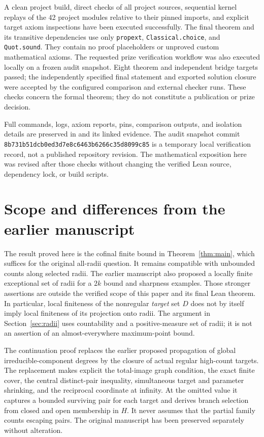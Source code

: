 \documentclass[11pt]{article}
\numberwithin{equation}{section}
\begin{document}
A clean project build, direct checks of all project sources, sequential
kernel replays of the 42 project modules relative to their pinned imports,
and explicit target axiom inspections have been executed successfully.
The final theorem and its transitive dependencies use only
\texttt{propext}, \texttt{Classical.choice}, and \texttt{Quot.sound}.
They contain no proof placeholders or unproved custom mathematical axioms.
The requested prize verification workflow was also executed locally on a
frozen audit snapshot. Eight theorem and independent bridge targets passed;
the independently specified final statement and exported solution closure
were accepted by the configured comparison and external checker runs.
These checks concern the formal theorem; they do not constitute a
publication or prize decision.

Full commands, logs, axiom reports, pins, comparison outputs, and isolation
details are preserved in  and its linked
evidence. The audit snapshot commit
\nolinkurl{8b731b51dcb0ed3d7e8c6463b6266c35d8099c85} is a temporary local
verification record, not a published repository revision.
The mathematical exposition here was revised after those checks without
changing the verified Lean source, dependency lock, or build scripts.

\section{Scope and differences from the earlier manuscript}\label{sec:scope}

The result proved here is the cofinal finite bound in
Theorem~\ref{thm:main}, which suffices for the original all-radii question.
It remains compatible with unbounded counts along selected radii.
The earlier manuscript also proposed a locally finite exceptional set of
radii for a $2k$ bound and sharpness examples. Those stronger assertions
are outside the verified scope of this paper and its final Lean theorem.
In particular, local finiteness of the nonregular \emph{target} set $D$
does not by itself imply local finiteness of its projection onto radii.
The argument in Section~\ref{sec:radii} uses countability and a
positive-measure set of radii; it is not an assertion of an almost-everywhere
maximum-point bound.

The continuation proof replaces the earlier proposed propagation of global
irreducible-component degrees by the closure of actual regular high-count
targets. The replacement makes explicit the total-image graph condition,
the exact finite cover, the central distinct-pair inequality, simultaneous
target and parameter shrinking, and the reciprocal coordinate at infinity.
At the omitted value it captures a bounded surviving pair for each target
and derives branch selection from closed and open membership in $H$.
It never assumes that the partial family counts escaping pairs.
The original manuscript has been preserved separately without alteration.
\end{document}
